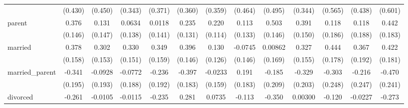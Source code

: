 {\begin{tabular}{l*{12}{c}}
                    &     (0.430)         &     (0.450)         &     (0.343)         &     (0.371)         &     (0.360)         &     (0.359)         &     (0.464)         &     (0.495)         &     (0.344)         &     (0.565)         &     (0.438)         &     (0.601)         \\
[1em]
parent              &       0.376\sym{**} &       0.131         &      0.0634         &      0.0118         &       0.235         &       0.220         &       0.113         &       0.503\sym{***}&       0.391\sym{**} &       0.118         &       0.118         &       0.442\sym{*}  \\
                    &     (0.146)         &     (0.147)         &     (0.138)         &     (0.141)         &     (0.131)         &     (0.114)         &     (0.133)         &     (0.146)         &     (0.150)         &     (0.186)         &     (0.188)         &     (0.183)         \\
[1em]
married             &       0.378\sym{*}  &       0.302\sym{*}  &       0.330\sym{*}  &       0.349\sym{*}  &       0.396\sym{**} &       0.130         &     -0.0745         &     0.00862         &       0.327\sym{*}  &       0.444\sym{*}  &       0.367         &       0.422\sym{*}  \\
                    &     (0.158)         &     (0.153)         &     (0.151)         &     (0.159)         &     (0.146)         &     (0.126)         &     (0.146)         &     (0.169)         &     (0.155)         &     (0.178)         &     (0.192)         &     (0.181)         \\
[1em]
married\_parent      &      -0.341         &     -0.0928         &     -0.0772         &      -0.236         &      -0.397\sym{*}  &     -0.0233         &       0.191         &      -0.185         &      -0.329         &      -0.303         &      -0.216         &      -0.470         \\
                    &     (0.195)         &     (0.193)         &     (0.188)         &     (0.192)         &     (0.183)         &     (0.159)         &     (0.183)         &     (0.209)         &     (0.203)         &     (0.248)         &     (0.247)         &     (0.241)         \\
[1em]
divorced            &      -0.261         &     -0.0105         &     -0.0115         &      -0.235         &       0.281         &      0.0735         &      -0.113         &      -0.350         &     0.00300         &      -0.120         &     -0.0227         &      -0.273         \\

\end{tabular}}
